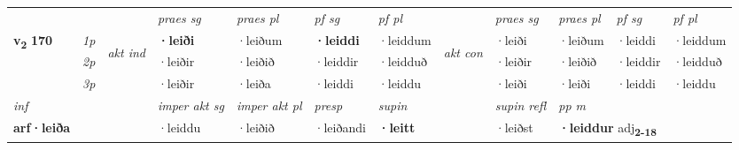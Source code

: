 \begin{longtable}[l]{X>{\footnotesize\itshape}llXXXXlXXXX}
 & &   & \textit{praes sg}  & \textit{praes pl}    & \textit{ pf sg} & \textit{pf pl} & & \textit{praes sg}  & \textit{praes pl}    & \textit{pf sg} & \textit{pf pl }  \\ \cmidrule{4-7} \cmidrule{9-12}
 \multirow{2}{*}{{{\textbf{v{\textsubscript{2}}} \Large{\textbf{170}}}}}  & 1p & \multirow{3}{*}{\begin{turn}{90}\textit{akt ind}\end{turn}} & \textbf{·leiði} & ·leiðum & \textbf{·leiddi} & ·leiddum & \multirow{3}{*}{\begin{turn}{90}\textit{akt con}\end{turn}} &·leiði & ·leiðum & ·leiddi & ·leiddum\\*
 & 2p &  &  ·leiðir  & ·leiðið & ·leiddir & ·leidduð & & ·leiðir & ·leiðið & ·leiddir & ·leidduð \\*
 & 3p &  & ·leiðir & ·leiða & ·leiddi & ·leiddu & & ·leiði & ·leiði& ·leiddi & ·leiddu \\*
\cmidrule{4-7} \cmidrule{9-12}

   {\textit{inf}} & &  & \textit{imper akt sg} & \textit{imper akt pl}   & \textit{presp} & \textit{supin} && \textit{supin refl} & \textit{pp m} \\*
  {\textbf{arf\allowbreak ·leiða}} & && ·leiddu  & ·leiðið   & ·leiðandi &  \textbf{·leitt} && ·leiðst & \multicolumn{2}{l}{\textbf{·leiddur} adj\textbf{\textsubscript{2-18}}} \\*

\midrule


\end{longtable}
